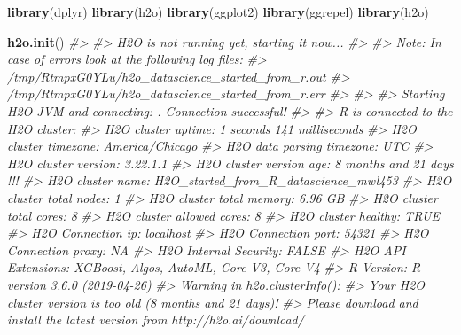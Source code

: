 \documentclass[]{book}
\newenvironment{Shaded}{\begin{snugshade}}{\end{snugshade}}
\newcommand{\CommentTok}[1]{\textcolor[rgb]{0.56,0.35,0.01}{\textit{#1}}}
\newcommand{\KeywordTok}[1]{\textcolor[rgb]{0.13,0.29,0.53}{\textbf{#1}}}
\newcommand{\NormalTok}[1]{#1}
\begin{document}
\begin{Shaded}
\begin{Highlighting}[]
\KeywordTok{library}\NormalTok{(dplyr)}
\KeywordTok{library}\NormalTok{(h2o)}
\KeywordTok{library}\NormalTok{(ggplot2)}
\KeywordTok{library}\NormalTok{(ggrepel)}
\KeywordTok{library}\NormalTok{(h2o)}

\KeywordTok{h2o.init}\NormalTok{()}
\CommentTok{#> }
\CommentTok{#> H2O is not running yet, starting it now...}
\CommentTok{#> }
\CommentTok{#> Note:  In case of errors look at the following log files:}
\CommentTok{#>     /tmp/RtmpxG0YLu/h2o_datascience_started_from_r.out}
\CommentTok{#>     /tmp/RtmpxG0YLu/h2o_datascience_started_from_r.err}
\CommentTok{#> }
\CommentTok{#> }
\CommentTok{#> Starting H2O JVM and connecting: . Connection successful!}
\CommentTok{#> }
\CommentTok{#> R is connected to the H2O cluster: }
\CommentTok{#>     H2O cluster uptime:         1 seconds 141 milliseconds }
\CommentTok{#>     H2O cluster timezone:       America/Chicago }
\CommentTok{#>     H2O data parsing timezone:  UTC }
\CommentTok{#>     H2O cluster version:        3.22.1.1 }
\CommentTok{#>     H2O cluster version age:    8 months and 21 days !!! }
\CommentTok{#>     H2O cluster name:           H2O_started_from_R_datascience_mwl453 }
\CommentTok{#>     H2O cluster total nodes:    1 }
\CommentTok{#>     H2O cluster total memory:   6.96 GB }
\CommentTok{#>     H2O cluster total cores:    8 }
\CommentTok{#>     H2O cluster allowed cores:  8 }
\CommentTok{#>     H2O cluster healthy:        TRUE }
\CommentTok{#>     H2O Connection ip:          localhost }
\CommentTok{#>     H2O Connection port:        54321 }
\CommentTok{#>     H2O Connection proxy:       NA }
\CommentTok{#>     H2O Internal Security:      FALSE }
\CommentTok{#>     H2O API Extensions:         XGBoost, Algos, AutoML, Core V3, Core V4 }
\CommentTok{#>     R Version:                  R version 3.6.0 (2019-04-26)}
\CommentTok{#> Warning in h2o.clusterInfo(): }
\CommentTok{#> Your H2O cluster version is too old (8 months and 21 days)!}
\CommentTok{#> Please download and install the latest version from http://h2o.ai/download/}
\end{Highlighting}
\end{Shaded}
\end{document}
